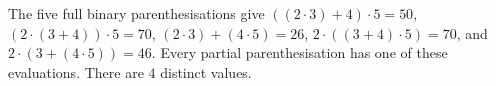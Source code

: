 The five full binary parenthesisations give $((2\cdot3)+4)\cdot5=50$, $(2\cdot(3+4))\cdot5=70$, $(2\cdot3)+(4\cdot5)=26$, $2\cdot((3+4)\cdot5)=70$, and $2\cdot(3+(4\cdot5))=46$. Every partial parenthesisation has one of these evaluations. There are $\boxed4$ distinct values.
